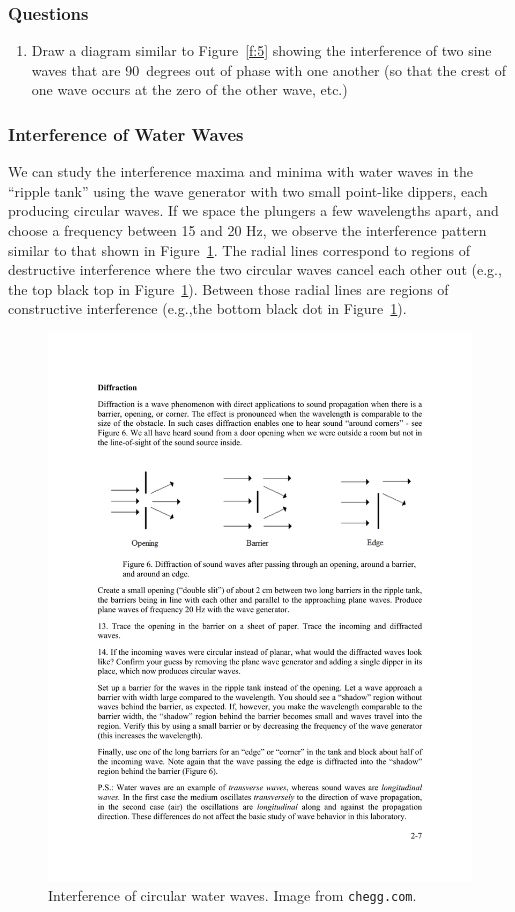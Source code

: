 \documentclass[11pt]{NSF}
\def\ben{\begin{enumerate}}
\def\een{\end{enumerate}}
\def\i{\item{}}
\begin{document}
\subsubsection*{Questions}
\ben

\i Draw a diagram similar to Figure~\ref{f:5} 
showing the interference of two sine waves that are 90~degrees
out of phase with one another 
(so that the crest of one wave occurs at the zero of the other wave, etc.)

\een

\subsubsection{Interference of Water Waves}

We can study the interference maxima and minima with water waves in the 
``ripple tank” using the wave generator with two small point-like dippers, 
each producing circular waves. 
If we space the plungers a few wavelengths apart, and choose a 
frequency between 15 and 20 Hz, we observe the interference pattern
similar to that shown in Figure~\ref{f:6}.
The radial lines correspond to regions of destructive interference
where the two circular waves cancel each other out (e.g., the 
top black top in Figure~\ref{f:6}).
Between those radial lines are regions of constructive interference
(e.g.,the bottom black dot in Figure~\ref{f:6}).
%
\begin{figure}[hbtp]
\begin{center}
\includegraphics[width=.5\textwidth]{fig2_6}
\caption{Interference of circular water waves.
Image from {\tt chegg.com}.}
\label{f:6}
\end{center}
\end{figure}
%
\end{document}
